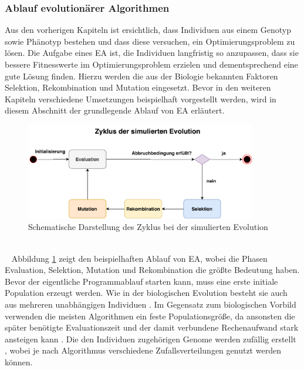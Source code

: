 \subsubsection{Ablauf evolutionärer Algorithmen}
Aus den vorherigen Kapiteln ist ersichtlich, dass Individuen aus einem Genotyp sowie Phänotyp bestehen und dass diese versuchen, ein Optimierungsproblem zu lösen. Die Aufgabe eines \ac{EA} ist, die Individuen langfristig so anzupassen, dass sie bessere Fitnesswerte im Optimierungsproblem erzielen und dementsprechend eine gute Lösung finden. Hierzu werden die aus der Biologie bekannten Faktoren Selektion, Rekombination und Mutation eingesetzt. Bevor in den weiteren Kapiteln verschiedene Umsetzungen beispielhaft vorgestellt werden, wird in diesem Abschnitt der grundlegende Ablauf von \ac{EA} erläutert.
\begin{figure}[h]
	\centering
	\includegraphics[width=0.9\textwidth]{./img/ea_basics/ea_cycle.pdf} 
	\caption{Schematische Darstellung des Zyklus bei der simulierten Evolution}
	\label{fig:ea_cycle}
\end{figure}
\\\ \noindent
Abbildung \ref{fig:ea_cycle} zeigt den beispielhaften Ablauf von \ac{EA}, wobei die Phasen Evaluation, Selektion, Mutation und Rekombination die größte Bedeutung haben. Bevor der eigentliche Programmablauf starten kann, muss eine erste initiale Population erzeugt werden. Wie in der biologischen Evolution besteht sie auch aus mehreren unabhängigen Individuen \cite{rothlauf2006representation}. Im Gegensatz zum biologischen Vorbild verwenden die meisten Algorithmen ein feste Populationsgröße, da ansonsten die später benötigte Evaluationszeit und der damit verbundene Rechenaufwand stark ansteigen kann \cite{rothlauf2006representation}. Die den Individuen zugehörigen Genome werden zufällig erstellt \cite{weicker2015evolutionare}, wobei je nach Algorithmus verschiedene Zufallsverteilungen genutzt werden können.
\\\\
